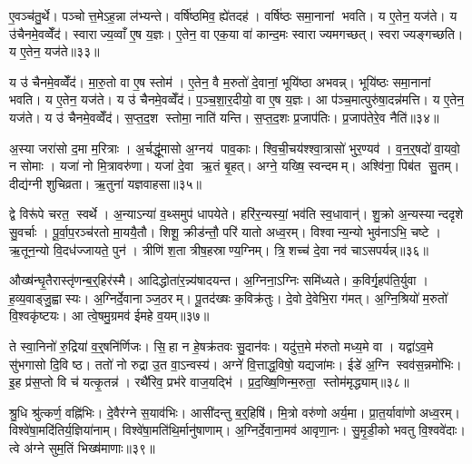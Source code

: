 ए॒वञ्च॑तु॒र्थे। पञ्चोत्त॒मेऽह॒न्ना ल॑भ्यन्ते। वर्\mbox{}षि॑ष्ठमिव॒ ह्ये॑तदह॑। वर्\mbox{}षि॑ष्ठः समा॒नानां भवति। य ए॒तेन॒ यज॑ते। य उ॑चैनमे॒वव्वेँद॑। स्वाराज्य॒व्वाँ ए॒ष य॒ज्ञः। ए॒तेन॒ वा एक॒या वा॑ कान्द॒मः स्वाराज्यमगच्छत्। स्वराज्यङ्गच्छति। य ए॒तेन॒ यज॑ते॥३३॥

य उ॑ चैनमे॒वव्वेँद॑। मा॒रु॒तो वा ए॒ष स्तोम॑। ए॒तेन॒ वै म॒रुतो॑ दे॒वानां॒ भूयि॑ष्ठा अभवन्न्। भूयि॑ष्ठः समा॒नानां भवति। य ए॒तेन॒ यज॑ते। य उ॑ चैनमे॒वव्वेँद॑। प॒ञ्च॒शा॒र॒दीयो॒ वा ए॒ष य॒ज्ञः। आ प॑ञ्च॒मात्पुरु॑षा॒दन्न॑मत्ति। य ए॒तेन॒ यज॑ते। य उ॑ चैनमे॒वव्वेँद॑। स॒प्त॒द॒श स्तोमा॒ नाति॑ यन्ति। स॒प्त॒द॒शः प्र॒जाप॑तिः। प्र॒जाप॑तेरे॒व नैति॑॥३४॥\anuvakamend[तृ॒तीये॑ गच्छति॒ य ए॒तेन॒ यज॑तेऽत्ति॒ य ए॒तेन॒ यज॑ते॒ य उ॑ चैनमे॒वव्वेँद॒ त्रीणि॑ च (अ॒गस्त्य॒ स्वाराज्यं मारु॒तः प॑ञ्चशार॒दीयो॒ वा ए॒ष य॒ज्ञः स॑प्तद॒शं प्र॒जाप॑तेरे॒व नैति॑ ॥ )]

अ॒स्या जरा॑सो द॒मा म॒रित्राः। अ॒र्चद्धू॑मासो अ॒ग्नय॑ पाव॒काः। श्वि॒ची॒चय॑श्श्वा॒त्रासो॑ भुर॒ण्यव॑। व॒न॒र्॒षदो॑ वा॒यवो॒ न सोमाः। यजा॑ नो मि॒त्रावरु॑णा। यजा॑ दे॒वा ऋ॒तं बृ॒हत्। अग्ने॒ यख्षि॒ स्वन्दमम्। अश्वि॑ना॒ पिब॑त सु॒तम्। दीद्य॑ग्नी शुचिव्रता। ऋ॒तुना॑ यज्ञवाहसा॥३५॥

द्वे विरू॑पे चरत॒ स्वर्थे। अ॒न्याऽन्या॑ व॒थ्समुप॑ धापयेते। हरि॑र॒न्यस्यां॒ भव॑ति स्व॒धावान्॑। शु॒क्रो अ॒न्यस्यान्ददृशे सु॒वर्चाः। पू॒र्वा॒प॒रञ्च॑रतो मा॒ययै॒तौ। शिशू॒ क्रीड॑न्तौ॒ परि॑ यातो अध्व॒रम्। विश्वान्य॒न्यो भुव॑नाऽभि॒ चष्टे। ऋ॒तून॒न्यो वि॒दध॑ज्जायते॒ पुन॑। त्रीणि॑ श॒ता त्रीष॒हस्राण्य॒ग्निम्। त्रि॒शच्च॑ दे॒वा नव॑ चाऽसपर्यन्न्॥३६॥

औख्ष॑न्घृ॒तैरास्तृ॑णन्ब॒र्॒हिर॑स्मै। आदिद्धोता॑र॒न्न्य॑षादयन्त। अ॒ग्निना॒ऽग्निः समि॑ध्यते। क॒विर्गृ॒हप॑ति॒र्युवा। ह॒व्य॒वाड्जु॒ह्वास्यः। अ॒ग्निर्दे॒वानाञ्ज॒ठरम्। पू॒तद॑ख्षः क॒विक्र॑तुः। दे॒वो दे॒वेभि॒रा ग॑मत्। अ॒ग्नि॒श्रियो॑ म॒रुतो॑ वि॒श्वकृ॑ष्टयः। आ त्वे॒षमु॒ग्रमव॑ ईमहे व॒यम्॥३७॥

ते स्वा॒निनो॑ रु॒द्रिया॑ व॒र्॒षनि॑र्णिजः। सि॒हा न हे॒षक्र॑तवः सु॒दान॑वः। यदु॑त्त॒मे म॑रुतो मध्य॒मे वा। यद्वा॑ऽव॒मे सु॑भगासो दि॒वि ष्ठ। ततो॑ नो रुद्रा उ॒त वा॒ऽन्वस्य॑। अग्ने॑ वि॒त्ताद्ध॒विषो॒ यद्यजा॑मः। ईडे॑ अ॒ग्नि स्वव॑स॒न्नमो॑भिः। इ॒ह प्र॑स॒प्तो वि च॑ यत्कृ॒तन्न॑। रथै॑रिव॒ प्रभ॑रे वाज॒यद्भि॑। प्र॒द॒ख्षि॒णिन्म॒रुता॒ स्तोम॑मृद्ध्याम्॥३८॥

श्रु॒धि श्रु॑त्कर्ण॒ वह्नि॑भिः। दे॒वैर॑ग्ने स॒याव॑भिः। आसी॑दन्तु ब॒र्॒हिषि॑। मि॒त्रो वरु॑णो अर्य॒मा। प्रा॒त॒र्यावा॑णो अध्व॒रम्। विश्वे॑षा॒मदि॑तिर्य॒ज्ञिया॑नाम्। विश्वे॑षा॒मति॑थि॒र्मानु॑षाणाम्। अ॒ग्निर्दे॒वाना॒मव॑ आवृणा॒नः। सु॒मृ॒डी॒को भवतु वि॒श्ववे॑दाः। त्वे अ॑ग्ने सुम॒तिं भिख्ष॑माणाः॥३९॥

